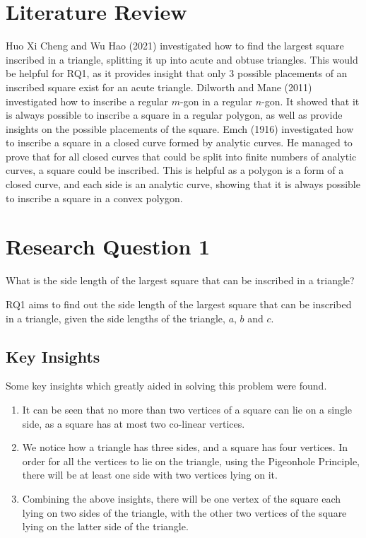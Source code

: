 \documentclass[12pt]{scrartcl}
\begin{document}
\section{Literature Review}
\cite{tbtb1} Huo Xi Cheng and Wu Hao (2021) investigated how to find the largest square inscribed in a triangle, splitting it up into acute and obtuse triangles. This would be helpful for RQ1, as it provides insight that only 3 possible placements of an inscribed square exist for an acute triangle.
\cite{dilworth} Dilworth and Mane (2011) investigated how to inscribe a regular $m$-gon in a regular $n$-gon. It showed that it is always possible to inscribe a square in a regular polygon, as well as provide insights on the possible placements of the square.
\cite{emch} Emch (1916) investigated how to inscribe a square in a closed curve formed by analytic curves. He managed to prove that for all closed curves that could be split into finite numbers of analytic curves, a square could be inscribed. This is helpful as a polygon is a form of a closed curve, and each side is an analytic curve, showing that it is always possible to inscribe a square in a convex polygon.

\pagebreak

\section{Research Question 1}
What is the side length of the largest square that can be inscribed in a triangle?

RQ1 aims to find out the side length of the largest square that can be inscribed in a triangle,
given the side lengths of the triangle, $a$, $b$ and $c$.

\subsection{Key Insights}
Some key insights which greatly aided in solving this problem were found.
\begin{enumerate}
	\item It can be seen that no more than two vertices of a square can lie on a single side,
	      as a square has at most two co-linear vertices.
	\item We notice how a triangle has three sides, and a square has four vertices.
	      In order for all the vertices to lie on the triangle, using the Pigeonhole Principle,
	      there will be at least one side with two vertices lying on it.
	\item Combining the above insights, there will be one vertex of the square
	      each lying on two sides of the triangle, with the other two vertices of the square
	      lying on the latter side of the triangle.
\end{enumerate}
\end{document}
